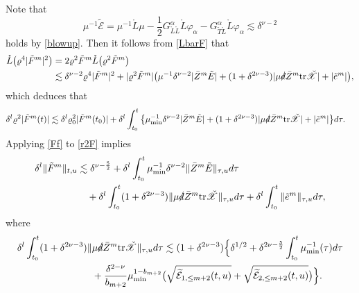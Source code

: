 \documentclass[11pt,twoside]{article}
\def\al{\alpha}
\def\vp{\varphi}
\def\f{\frac}
\begin{document}
Note that
\[\mu^{-1}\tilde{\mathcal E}=\mu^{-1}\mathring L\mu-\f12G_{\mathring L\mathring L}^\al\mathring L\vp_\al-G_{\tilde T\mathring L}^\al\mathring L\vp_\al\lesssim\delta^{\nu-2}\]
holds by \eqref{blowup}.
Then it follows from \eqref{LbarF} that
\begin{equation*}
\begin{split}
\mathring{L}\bigl( \varrho^4 |\tilde{F}^m|^2 \bigr)
&= 2\varrho^2 \tilde{F}^m \mathring{L}\bigl( \varrho^2 \tilde{F}^m \bigr) \\
&\lesssim \delta^{\nu-2} \varrho^4 |\tilde{F}^m|^2 + |\varrho^2 \tilde{F}^m| \big(
\mu^{-1} \delta^{\nu-2} |\bar{Z}^m \tilde{E}| + (1+\delta^{2\nu-3}) |\mu \slashed{d} \bar{Z}^m \mathrm{tr}\check{\mathscr{X}}| + |\tilde{e}^m|
\big),
\end{split}
\end{equation*}
which deduces that
\begin{equation}\label{r2F}
\begin{split}
\delta^{l} \varrho^2 |\tilde{F}^m(t)|
&\lesssim \delta^{l} \varrho_0^2 |\tilde{F}^m(t_0)| + \delta^{l} \int_{t_0}^t \big\{
\mu_{\min}^{-1} \delta^{\nu-2} |\bar{Z}^m \tilde{E}| + (1+\delta^{2\nu-3}) |\mu \slashed{d} \bar{Z}^m \mathrm{tr}\check{\mathscr{X}}| + |\tilde{e}^m|
\big\} d\tau.
\end{split}
\end{equation}
Applying \eqref{Ff} to \eqref{r2F} implies
\begin{equation}\label{F}
\begin{split}
\delta^{l} \|\tilde{F}^m\|_{t,u}
&\lesssim \delta^{\nu-\frac{5}{2}} + \delta^{l} \int_{t_0}^t \mu_{\min}^{-1} \delta^{\nu-2} \|\bar{Z}^m \tilde{E}\|_{\tau,u} d\tau \\
&\quad + \delta^{l} \int_{t_0}^t (1+\delta^{2\nu-3}) \|\mu \slashed{d} \bar{Z}^m \mathrm{tr}\check{\mathscr{X}}\|_{\tau,u} d\tau + \delta^{l} \int_{t_0}^t \|\tilde{e}^m\|_{\tau,u} d\tau,
\end{split}
\end{equation}
where
\begin{equation}\label{chi}
\begin{split}
\delta^{l} \int_{t_0}^t (1+\delta^{2\nu-3}) \|&\mu \slashed{d} \bar{Z}^m \mathrm{tr}\check{\mathscr{X}}\|_{\tau,u} d\tau
\lesssim(1+\delta^{2\nu-3}) \Big\{\delta^{1/2}+\delta^{2\nu-\f52}\int_{t_0}^t\mu_{\min}^{-1}(\tau)d\tau\\
&+\f{\delta^{2-\nu}}{b_{m+2}}\mu_{\min}^{1-b_{m+2}}\bigl(\sqrt{\widetilde{\mathcal{E}}_{1,\leq m+2}(t,u)} + \sqrt{\widetilde{\mathcal{E}}_{2,\leq m+2}(t,u)} \bigr)
\Big\}.
\end{split}
\end{equation}
\end{document}
